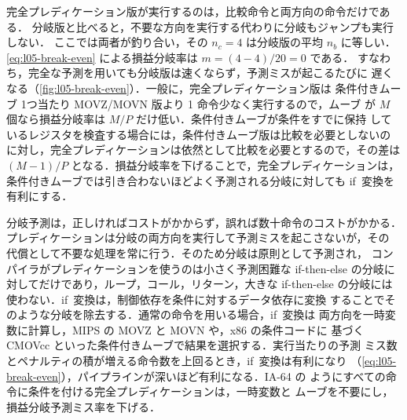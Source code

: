\documentclass[../main.tex]{subfiles}
\begin{document}
完全プレディケーション版が実行するのは，比較命令と両方向の命令だけである．%
分岐版と比べると，不要な方向を実行する代わりに分岐もジャンプも実行しない．
ここでは両者が釣り合い，その $n_c = 4$ は分岐版の平均 $n_b$ に等しい．
\cref{eq:l05-break-even} による損益分岐率は $m = (4-4)/20 = 0$ である．
すなわち，完全な予測を用いても分岐版は速くならず，予測ミスが起こるたびに
遅くなる（\cref{fig:l05-break-even}）．一般に，完全プレディケーション版は
条件付きムーブ 1つ当たり MOVZ/MOVN 版より 1 命令少なく実行するので，ムーブ
が $M$ 個なら損益分岐率は $M/P$ だけ低い．条件付きムーブが条件をすでに保持
しているレジスタを検査する場合には，条件付きムーブ版は比較を必要としないの
に対し，完全プレディケーションは依然として比較を必要とするので，その差は
$(M-1)/P$ となる．損益分岐率を下げることで，完全プレディケーションは，
条件付きムーブでは引き合わないほどよく予測される分岐に対しても if~変換を
有利にする．

\begin{keypoint}[章のまとめ]
  分岐予測は，正しければコストがかからず，誤れば数十命令のコストがかかる．
  プレディケーションは分岐の両方向を実行して予測ミスを起こさないが，その
  代償として不要な処理を常に行う．そのため分岐は原則として予測され，
  コンパイラがプレディケーションを使うのは小さく予測困難な if-then-else
  の分岐に対してだけであり，ループ，コール，リターン，大きな if-then-else
  の分岐には使わない．if~変換は，制御依存を条件に対するデータ依存に変換
  することでそのような分岐を除去する．通常の命令を用いる場合，if~変換は
  両方向を一時変数に計算し，MIPS の MOVZ と MOVN や，x86 の条件コードに
  基づく CMOVcc といった条件付きムーブで結果を選択する．実行当たりの予測
  ミス数とペナルティの積が増える命令数を上回るとき，if~変換は有利になり
  （\cref{eq:l05-break-even}），パイプラインが深いほど有利になる．IA-64 の
  ようにすべての命令に条件を付ける完全プレディケーションは，一時変数と
  ムーブを不要にし，損益分岐予測ミス率を下げる．
\end{keypoint}
\end{document}
